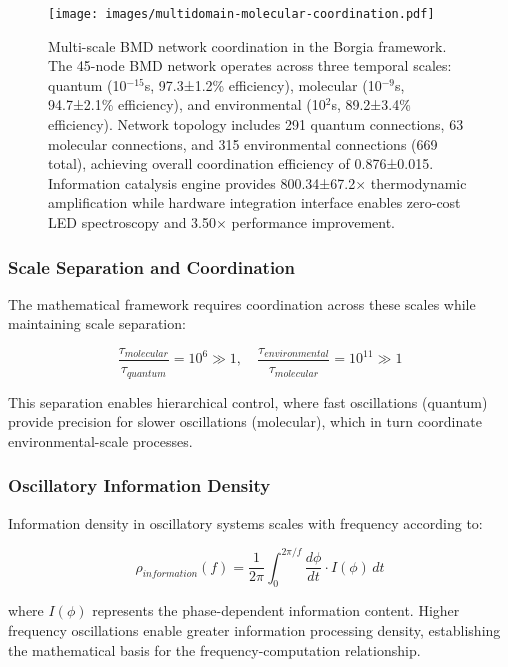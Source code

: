 \documentclass[12pt,a4paper]{article}
\begin{document}
\begin{figure}[H]
    \centering
    \texttt{[image: images/multidomain-molecular-coordination.pdf]}
    \caption{Multi-scale BMD network coordination in the Borgia framework. The 45-node BMD network operates across three temporal scales: quantum (10$^{-15}$s, 97.3±1.2\% efficiency), molecular (10$^{-9}$s, 94.7±2.1\% efficiency), and environmental (10$^{2}$s, 89.2±3.4\% efficiency). Network topology includes 291 quantum connections, 63 molecular connections, and 315 environmental connections (669 total), achieving overall coordination efficiency of 0.876±0.015. Information catalysis engine provides 800.34±67.2× thermodynamic amplification while hardware integration interface enables zero-cost LED spectroscopy and 3.50× performance improvement.}
    \label{fig:multiscale_framework}
    \end{figure}

\subsubsection{Scale Separation and Coordination}

The mathematical framework requires coordination across these scales while maintaining scale separation:

\begin{equation}
\frac{\tau_{molecular}}{\tau_{quantum}} = 10^{6} \gg 1, \quad \frac{\tau_{environmental}}{\tau_{molecular}} = 10^{11} \gg 1
\end{equation}

This separation enables hierarchical control, where fast oscillations (quantum) provide precision for slower oscillations (molecular), which in turn coordinate environmental-scale processes.

\subsubsection{Oscillatory Information Density}

Information density in oscillatory systems scales with frequency according to:

\begin{equation}
\rho_{information}(f) = \frac{1}{2\pi} \int_0^{2\pi/f} \frac{d\phi}{dt} \cdot I(\phi) \, dt
\end{equation}

where $I(\phi)$ represents the phase-dependent information content. Higher frequency oscillations enable greater information processing density, establishing the mathematical basis for the frequency-computation relationship.
\end{document}
